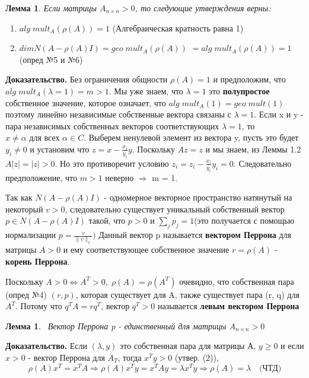 \documentclass[a4paper,12pt,leqno]{article} %
\newtheorem{lemma}[theorem]{Лемма}
\begin{document}
\begin{lemma}
    \noindent Если матрицы $A_{n \times n} > 0$, 
    то следующие утверждения верны:
\end{lemma}
    \begin{enumerate}
        \item $alg \; mult_{A}(\rho(A)) = 1$ (Алгебраическая кратность равна 1)
        \item $dimN(A - \rho(A)I) = geo \; mult_{A}(\rho(A))$
        $ = alg \; mult_{A}(\rho(A)) = 1$ (опред №5 и №6)
    \end{enumerate}

\noindent\textbf{Доказательство.} 
    Без ограничения общности $\rho(A) = 1$ и 
    предположим, что $alg \; mult_{A} (\lambda = 1) = m > 1$.
    Мы уже знаем, что $\lambda = 1$ это \textbf{полупростое}
    собственное значение, которое означает, что $alg \; mult_{A}(1) = geo \; mult(1)$
    поэтому линейно независимые собственные вектора связаны с $\lambda = 1.$
    Если x и y - пара независимых собственных векторов соответствующих $\lambda = 1$,
    то $x \neq \alpha \text{ для всех } \alpha \in C$. Выберем ненулевой элемент из вектора y,
    пусть это будет $y_{i} \neq 0$ и установим что $z = x - \frac{x_i}{y_i}y.$ Поскольку $Az = z$  и мы знаем,
    из Леммы 1.2 $A|z| = |z| > 0.$ Но это противоречит условию
    $z_i = z_i - \frac{x_i}{y_i}y_i =0.$
    Следовательно предположение, что $m > 1$ неверно $\Rightarrow$ m = 1.

    Так как $N(A - \rho(A)I)$ - одномерное векторное пространство натянутый на некоторый
    $v > 0$, следовательно существует уникальный собственный вектор $p \in N(A - \rho(A)I)$
    такой, что $p > 0$ и $\sum_j p_j = 1 $(это получается с помощью нормализации $p = \frac{v}{\|v\|_1})$
    Данный вектор p называется \textbf{вектором Перрона} для матрицы $A > 0$ и ему соответствующее
    собственное значение $r = \rho(A)$ - \textbf{корень Перрона}.
    
    Поскольку $A > 0 \Leftrightarrow A^T > 0, \; \rho(A) = \rho(A^T)$ очевидно, что собственная пара (опред №4)
    $(r, p)$, которая существует для A, также существует пара (r, q) для $A^T$.
    Потому что $q^T A = r q^T$, вектор $q^T > 0$ называется \textbf{левым вектором Перрона}
    \begin{lemma}
     Вектор Перрона p - единственный для матрицы  $A_{n \times n} > 0$
    \end{lemma} 
    
    \noindent    \textbf{Доказательство.} 
    Если $(\lambda, y)$ это собственная пара для матрицы А, \newline
    $y \geq 0$ и если $ x > 0$ - вектор Перрона для $A_T$, тогда $x^Ty > 0$ (утвер.
    (2)), 
    \begin{equation*}
        \rho(A)x^T = x^TA \Rightarrow \rho(A)x^Ty = x^TAy = \lambda x^T y \Rightarrow \rho(A) = \lambda \quad \text{(ЧТД)}
    \end{equation*}
    
\end{document}
